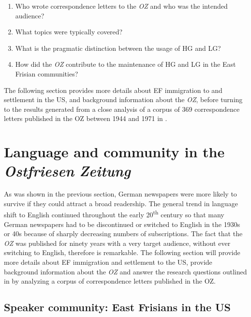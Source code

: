\documentclass[output=paper]{langsci/langscibook}
\begin{document}
\begin{enumerate}
\item Who wrote correspondence letters to the \textit{OZ} and who was the intended audience?
 
\item What topics were typically covered?
 
\item  What is the pragmatic distinction between the usage of HG and LG?
 
\item How did the \textit{OZ} contribute to the maintenance of HG and LG in the East Frisian communities? 
%
\end{enumerate}
 
  

The following section provides more details about EF immigration to and settlement in the US, and background information about the \textit{OZ}, before turning to the results generated from a close analysis of a corpus of 369 correspondence letters published in the OZ between 1944 and 1971 in .


\section{Language and community in the \textit{Ostfriesen} \textit{Zeitung}}
\label{sec:rocker:3}


As was shown in the previous section, German newspapers were more likely to survive if they could attract a broad readership. The general trend in language shift to English continued throughout the early 20\textsuperscript{th} century so that many German newspapers had to be discontinued or switched to English in the 1930s or 40s because of sharply decreasing numbers of subscriptions. The fact that the \textit{OZ} was published for ninety years with a very target audience, without ever switching to English, therefore is remarkable. The following section will provide more details about EF immigration and settlement to the US, provide background information about the \textit{OZ} and answer the research questions outlined in  by analyzing a corpus of correspondence letters published in the OZ.

\subsection{Speaker community: East Frisians in the US} %
\label{sec:rocker:3.1}
\end{document}
